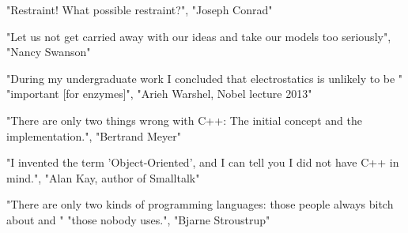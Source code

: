 "Restraint! What possible restraint?", "Joseph Conrad"


"Let us not get carried away with our ideas and take our models too seriously",
          "Nancy Swanson"
          
          
          "During my undergraduate work I concluded that electrostatics is unlikely to be "
          "important [for enzymes]",
          "Arieh Warshel, Nobel lecture 2013" 
          
"There are only two things wrong with C++:  The initial concept and the implementation.",
          "Bertrand Meyer"

"I invented the term 'Object-Oriented', and I can tell you I did not have C++ in mind.",
          "Alan Kay, author of Smalltalk"
          
"There are only two kinds of programming languages: those people always bitch about and "
          "those nobody uses.",
          "Bjarne Stroustrup" 